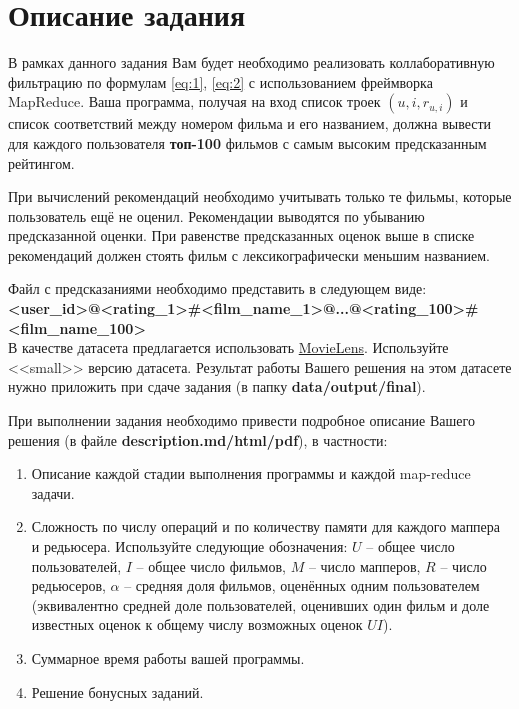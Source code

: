 \documentclass[11pt, fleqn]{article}
\begin{document}
\section{Описание задания}
В рамках данного задания Вам будет необходимо реализовать коллаборативную фильтрацию по формулам \ref{eq:1}, \ref{eq:2} с использованием фреймворка MapReduce. Ваша программа, получая на вход список троек $(u, i, r_{u,i})$ и список соответствий между номером фильма и его названием, должна вывести для каждого пользователя \textbf{топ-100} фильмов с самым высоким предсказанным рейтингом. 

При вычислений рекомендаций необходимо учитывать только те фильмы, которые пользователь ещё не оценил. Рекомендации выводятся по убыванию предсказанной оценки. При равенстве предсказанных оценок выше в списке рекомендаций должен стоять фильм с лексикографически меньшим названием.

Файл с предсказаниями необходимо представить в следующем виде:\\
\textbf{<user\_id>@<rating\_1>\#<film\_name\_1>@...@<rating\_100>\#<film\_name\_100>}\\


В качестве датасета предлагается использовать \href{https://grouplens.org/datasets/movielens/latest/}{MovieLens}. Используйте <<small>> версию датасета. Результат работы Вашего решения на этом датасете нужно приложить при сдаче задания (в папку \textbf{data/output/final}).

При выполнении задания необходимо привести подробное описание Вашего решения (в файле \textbf{description.md/html/pdf}), в частности:
\begin{enumerate}
	\item Описание каждой стадии выполнения программы и каждой map-reduce задачи.
	\item Сложность по числу операций и по количеству памяти для каждого маппера и редьюсера. Используйте следующие обозначения: $U$ -- общее число пользователей, $I$ -- общее число фильмов, $M$ -- число мапперов, $R$ -- число редьюсеров,
	$\alpha$ -- средняя доля фильмов, оценённых одним пользователем (эквивалентно средней доле пользователей, оценивших один фильм и доле известных оценок к общему числу возможных оценок $UI$).
	\item Суммарное время работы вашей программы.
	\item Решение бонусных заданий.
\end{enumerate}
\end{document}
